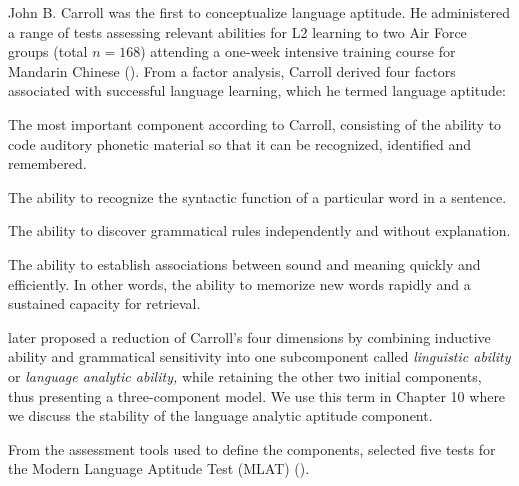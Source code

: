 \documentclass[output=paper]{langscibook}
\begin{document}
John B. Carroll was the first to conceptualize language aptitude. He administered a range of tests assessing relevant abilities for L2 learning to two Air Force groups (total $n=168$) attending a one-week intensive training course for Mandarin Chinese (\citealt{Carroll1958,Carroll1964,Carroll1958}). From a factor analysis, Carroll derived four factors associated with successful language learning, which he termed language aptitude: 

\begin{description}\sloppy
\item[Phonetic coding ability:] The most important component according to Carroll, consisting of the ability to code auditory phonetic material so that it can be recognized, identified and remembered.

\item[Grammatical sensitivity:] The ability to recognize the syntactic function of a particular word in a sentence.

\item[Inductive learning ability:] The ability to discover grammatical rules independently and without explanation.

\item[Rote learning ability:] The ability to establish associations between sound and meaning quickly and efficiently. In other words, the ability to memorize new words rapidly and a sustained capacity for retrieval.

\end{description}

\begin{sloppypar}
\citet{Skehan1998} later proposed a reduction of Carroll’s four dimensions by combining inductive ability and grammatical sensitivity into one subcomponent called \textit{linguistic ability} or \textit{language analytic ability,} while retaining the other two initial components, thus presenting a three-component model. We use this term in Chapter 10 where we discuss the stability of the language analytic aptitude component. 
\end{sloppypar}

From the assessment tools used to define the components, \citet{CarrollSapon1959} selected five tests for the Modern Language Aptitude Test (MLAT) ().
\end{document}
